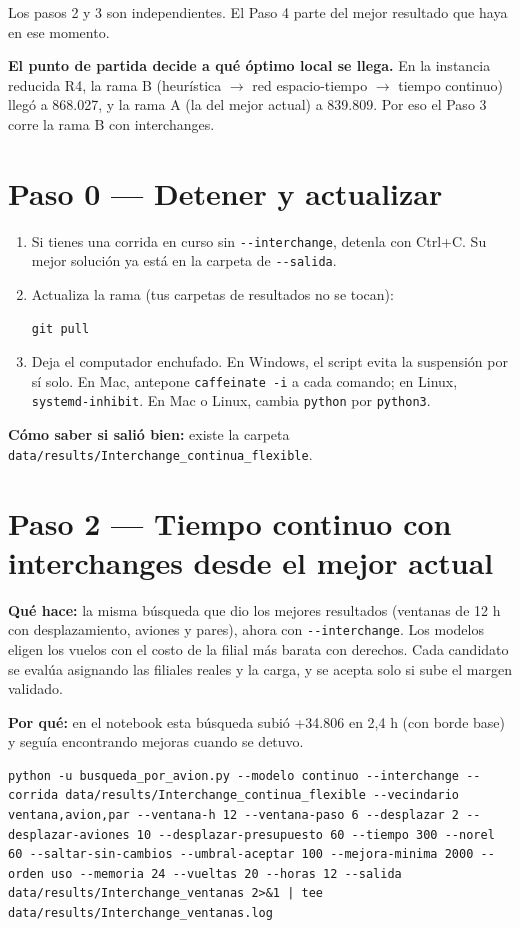 \documentclass[11pt,a4paper]{article}
\newcommand{\campo}[1]{\par\smallskip\textbf{\color{acento}#1}\quad}
\begin{document}
Los pasos 2 y 3 son independientes. El Paso 4 parte del mejor resultado que haya en ese momento.

\textbf{El punto de partida decide a qué óptimo local se llega.} En la instancia reducida R4, la rama B (heurística $\to$ red espacio-tiempo $\to$ tiempo continuo) llegó a 868.027, y la rama A (la del mejor actual) a 839.809. Por eso el Paso 3 corre la rama B con interchanges.

\section{Paso 0 --- Detener y actualizar}

\begin{enumerate}
  \item Si tienes una corrida en curso sin \texttt{-{}-interchange}, detenla con Ctrl+C. Su mejor solución ya está en la carpeta de \texttt{-{}-salida}.
  \item Actualiza la rama (tus carpetas de resultados no se tocan):
\begin{lstlisting}
git pull
\end{lstlisting}
  \item Deja el computador enchufado. En Windows, el script evita la suspensión por sí solo. En Mac, antepone \texttt{caffeinate -i} a cada comando; en Linux, \texttt{systemd-inhibit}. En Mac o Linux, cambia \texttt{python} por \texttt{python3}.
\end{enumerate}

\campo{Cómo saber si salió bien:} existe la carpeta \texttt{data/results/Interchange\_continua\_flexible}.

\section{Paso 2 --- Tiempo continuo con interchanges desde el mejor actual}

\campo{Qué hace:} la misma búsqueda que dio los mejores resultados (ventanas de 12 h con desplazamiento, aviones y pares), ahora con \texttt{-{}-interchange}. Los modelos eligen los vuelos con el costo de la filial más barata con derechos. Cada candidato se evalúa asignando las filiales reales y la carga, y se acepta solo si sube el margen validado.

\campo{Por qué:} en el notebook esta búsqueda subió +34.806 en 2,4 h (con borde base) y seguía encontrando mejoras cuando se detuvo.

\begin{lstlisting}
python -u busqueda_por_avion.py --modelo continuo --interchange --corrida data/results/Interchange_continua_flexible --vecindario ventana,avion,par --ventana-h 12 --ventana-paso 6 --desplazar 2 --desplazar-aviones 10 --desplazar-presupuesto 60 --tiempo 300 --norel 60 --saltar-sin-cambios --umbral-aceptar 100 --mejora-minima 2000 --orden uso --memoria 24 --vueltas 20 --horas 12 --salida data/results/Interchange_ventanas 2>&1 | tee data/results/Interchange_ventanas.log
\end{lstlisting}
\end{document}
